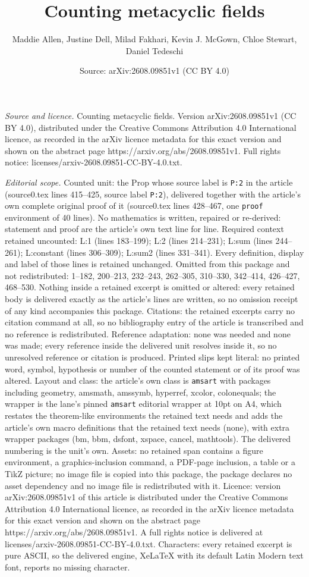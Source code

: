 \documentclass[10pt,a4paper]{amsart}
\title[Counting metacyclic fields]{Counting metacyclic fields}
\author{Maddie Allen, Justine Dell, Milad Fakhari, Kevin J. McGown, Chloe Stewart, Daniel Tedeschi}
\date{Source: arXiv:2608.09851v1 (CC BY 4.0)}
\begin{document}
\maketitle

\noindent\emph{Source and licence.} Counting metacyclic fields. Version arXiv:2608.09851v1 (CC BY 4.0), distributed under the Creative Commons Attribution 4.0 International licence, as recorded in the arXiv licence metadata for this exact version and shown on the abstract page https://arxiv.org/abs/2608.09851v1. Full rights notice: licenses/arxiv-2608.09851-CC-BY-4.0.txt.\par\smallskip

\noindent\textit{Editorial scope.} Counted unit: the Prop whose source label is \texttt{P:2} in the article (source0.tex lines 415--425, source label \texttt{P:2}), delivered together with the article's own complete original proof of it (source0.tex lines 428--467, one \texttt{proof} environment of 40 lines). No mathematics is written, repaired or re-derived: statement and proof are the article's own text line for line. Required context retained uncounted: L:1 (lines 183--199); L:2 (lines 214--231); L:sum (lines 244--261); L:constant (lines 306--309); L:sum2 (lines 331--341). Every definition, display and label of those lines is retained unchanged. Omitted from this package and not redistributed: 1--182, 200--213, 232--243, 262--305, 310--330, 342--414, 426--427, 468--530. Nothing inside a retained excerpt is omitted or altered: every retained body is delivered exactly as the article's lines are written, so no omission receipt of any kind accompanies this package. Citations: the retained excerpts carry no citation command at all, so no bibliography entry of the article is transcribed and no reference is redistributed. Reference adaptation: none was needed and none was made; every reference inside the delivered unit resolves inside it, so no unresolved reference or citation is produced. Printed slips kept literal: no printed word, symbol, hypothesis or number of the counted statement or of its proof was altered. Layout and class: the article's own class is \texttt{amsart} with packages including geometry, amsmath, amssymb, hyperref, xcolor, colonequals; the wrapper is the lane's pinned \texttt{amsart} editorial wrapper at 10pt on A4, which restates the theorem-like environments the retained text needs and adds the article's own macro definitions that the retained text needs (none), with extra wrapper packages (bm, bbm, dsfont, xspace, cancel, mathtools). The delivered numbering is the unit's own. Assets: no retained span contains a figure environment, a graphics-inclusion command, a PDF-page inclusion, a table or a TikZ picture; no image file is copied into this package, the package declares no asset dependency and no image file is redistributed with it. Licence: version arXiv:2608.09851v1 of this article is distributed under the Creative Commons Attribution 4.0 International licence, as recorded in the arXiv licence metadata for this exact version and shown on the abstract page https://arxiv.org/abs/2608.09851v1. A full rights notice is delivered at licenses/arxiv-2608.09851-CC-BY-4.0.txt. Characters: every retained excerpt is pure ASCII, so the delivered engine, XeLaTeX with its default Latin Modern text font, reports no missing character.
\end{document}
